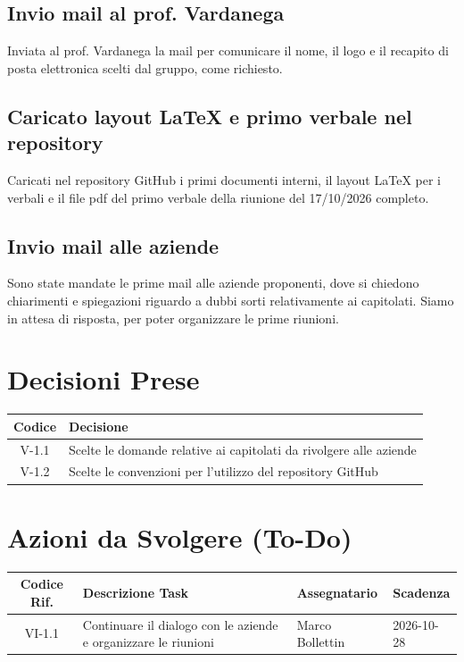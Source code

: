 \documentclass[a4paper, 11pt]{article}
\begin{document}
\subsection{Invio mail al prof. Vardanega}
Inviata al prof. Vardanega la mail per comunicare il nome, il logo e il recapito di posta elettronica scelti dal gruppo, come richiesto.

\subsection{Caricato layout LaTeX e primo verbale nel repository}
Caricati nel repository GitHub i primi documenti interni, il layout LaTeX per i verbali e il file pdf del primo verbale della riunione del 17/10/2026 completo.

\subsection{Invio mail alle aziende}
Sono state mandate le prime mail alle aziende proponenti, dove si chiedono chiarimenti e spiegazioni riguardo a dubbi sorti relativamente ai capitolati. Siamo in attesa di risposta, per poter organizzare le prime riunioni.

\section{Decisioni Prese}
\renewcommand{\arraystretch}{1.5}
\begin{tabularx}{\textwidth}{|c|X|}
\hline
\textbf{Codice} & \textbf{Decisione} \\ \hline
V-1.1 & Scelte le domande relative ai capitolati da rivolgere alle aziende \\ \hline
V-1.2 & Scelte le convenzioni per l'utilizzo del repository GitHub\\ \hline


\end{tabularx}

\vspace{0.5cm}
\section{Azioni da Svolgere (To-Do)}
\begin{tabularx}{\textwidth}{|c|X|l|l|}
\hline
\textbf{Codice Rif.} & \textbf{Descrizione Task} & \textbf{Assegnatario} & \textbf{Scadenza} \\ \hline
VI-1.1 & Continuare il dialogo con le aziende e organizzare le riunioni & Marco Bollettin & 2026-10-28 \\ \hline


\end{tabularx}
\end{document}
